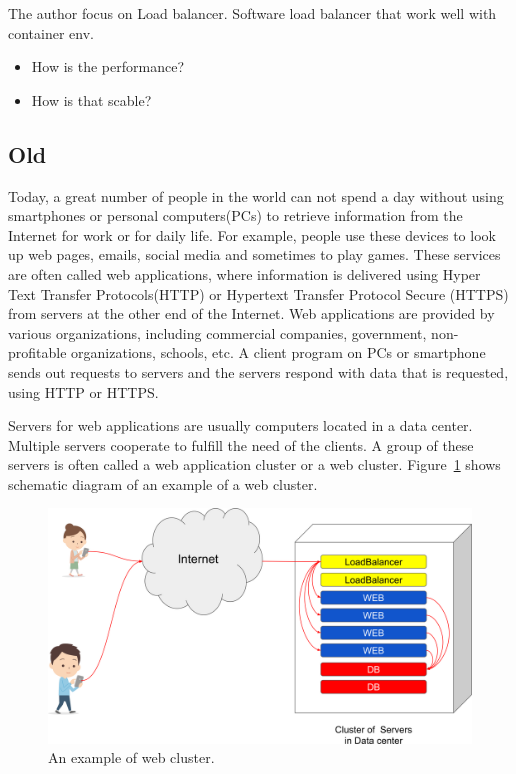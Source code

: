 The author focus on Load balancer.
Software load balancer that work well with container env.

\begin{itemize}
\item How is the performance?
\item How is that scable?
\end{itemize}

\subsection{Old}


Today, a great number of people in the world can not spend a day without using smartphones or personal computers(PCs) to retrieve information from the Internet for work or for daily life.
For example, people use these devices to look up web pages, emails, social media and sometimes to play games.
These services are often called web applications, where information is delivered using Hyper Text Transfer Protocols(HTTP) or Hypertext Transfer Protocol Secure (HTTPS) from servers at the other end of the Internet.
Web applications are provided by various organizations, including commercial companies, government, non-profitable organizations, schools, etc.
A client program on PCs or smartphone sends out requests to servers and the servers respond with data that is requested, using HTTP or HTTPS. 

Servers for web applications are usually computers located in a data center.
Multiple servers cooperate to fulfill the need of the clients.
A group of these servers is often called a web application cluster or a web cluster.
Figure~\ref{fig:web_cluster} shows schematic diagram of an example of a web cluster.

\begin{figure}[h]
\begin{center}
\includegraphics[width=0.8\columnwidth]{Figs/web_cluster.png}
\end{center}
\caption{
An example of web cluster.
}
\label{fig:web_cluster}
\end{figure}

